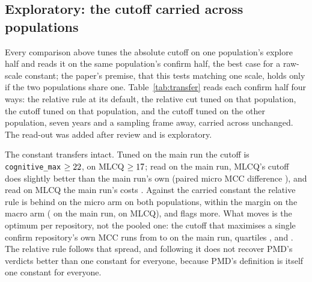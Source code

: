 \documentclass[11pt,a4paper]{article}
\newcommand{\fitwidth}[1]{\resizebox{\ifdim\width>\textwidth\textwidth\else\width\fi}{!}{#1}}
\newcommand{\sig}[1]{\texttt{#1}}
\begin{document}
\subsection{Exploratory: the cutoff carried across populations}
\label{sec:transfer}

Every comparison above tunes the absolute cutoff on one population's explore
half and reads it on the same population's confirm half, the best case for a
raw-scale constant; the paper's premise, that this tests matching one scale,
holds only if the two populations share one. Table~\ref{tab:transfer} reads
each confirm half four ways: the relative rule at its default, the relative
cut tuned on that population, the cutoff tuned on that population, and the
cutoff tuned on the other population, seven years and a sampling frame away,
carried across unchanged. The read-out was added after review and is
exploratory.

\begin{table}[t]
\centering
\caption{Exploratory: the absolute cutoff on \sig{cognitive\_max} carried
between populations, and the relative cut tuned on each population, against
PMD GodClass on each population's confirm half. Macro MCC is over the
repositories with at least one god class, macro FPR over every repository
carrying the definition.}
\label{tab:transfer}
\small
\setlength{\tabcolsep}{4pt}
\fitwidth{}
\end{table}

The constant transfers intact. Tuned on the main run the cutoff is
\sig{cognitive\_max} $\geq 22$, on MLCQ $\geq
17$; read on the main run, MLCQ's cutoff does slightly
better than the main run's own (paired micro MCC difference
\transferMainOtherMinusOwnMicroMcc{} \transferMainOtherMinusOwnMicroMccCI{}),
and read on MLCQ the main run's costs \transferMlcqOtherMinusOwnMicroMcc{}
\transferMlcqOtherMinusOwnMicroMccCI{}. Against the carried constant the
relative rule is behind on the micro arm on both populations, within the
margin on the macro arm (\transferMainRelMinusOtherMacroMcc{}
\transferMainRelMinusOtherMacroMccCI{} on the main run,
\transferMlcqRelMinusOtherMacroMcc{} \transferMlcqRelMinusOtherMacroMccCI{}
on MLCQ), and flags more. What moves is the optimum per repository, not the
pooled one: the cutoff that maximises a single confirm repository's own MCC
runs from \transferMainOptCutMin{} to \transferMainOptCutMax{} on the main
run, quartiles \transferMainOptCutQOne{}, \transferMainOptCutMedian{} and
\transferMainOptCutQThree{}. The relative rule follows that spread, and
following it does not recover PMD's verdicts better than one constant for
everyone, because PMD's definition is itself one constant for everyone.
\end{document}
